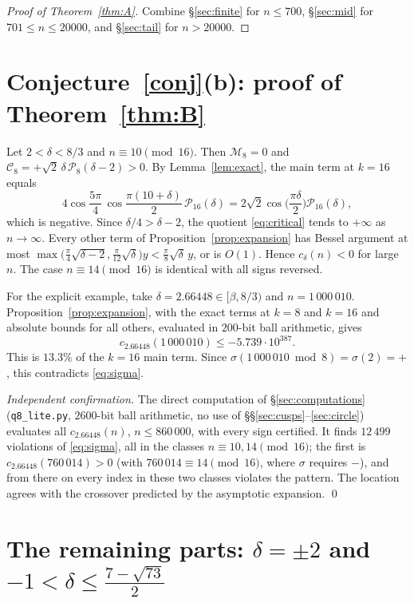 \documentclass[11pt]{amsart}
\theoremstyle{remark}
\theoremstyle{definition}
\newcommand{\cP}{\mathcal P}
\begin{document}
\begin{proof}[Proof of Theorem~\ref{thm:A}]
Combine \S\ref{sec:finite} for $n\le700$, \S\ref{sec:mid} for $701\le n\le20000$, and \S\ref{sec:tail} for $n>20000$.
\end{proof}

\section{Conjecture~\ref{conj}(b): proof of Theorem~\ref{thm:B}}\label{sec:B}

Let $2<\delta<8/3$ and $n\equiv10\pmod{16}$. Then $\mathcal M_8=0$ and $\mathcal C_8=+\sqrt2\,\delta\,\cP_8(\delta-2)>0$. By Lemma~\ref{lem:exact}, the main term at $k=16$ equals
\[
4\cos\frac{5\pi}4\,\cos\frac{\pi(10+\delta)}2\,\cP_{16}(\delta)=2\sqrt2\cos\Big(\frac{\pi\delta}2\Big)\cP_{16}(\delta),
\]
which is negative. Since $\delta/4>\delta-2$, the quotient \eqref{eq:critical} tends to $+\infty$ as $n\to\infty$. Every other term of Proposition~\ref{prop:expansion} has Bessel argument at most $\max\big(\frac\pi4\sqrt{\delta-2},\frac\pi{12}\sqrt\delta\big)y<\frac\pi8\sqrt\delta\,y$, or is $O(1)$. Hence $c_\delta(n)<0$ for large $n$. The case $n\equiv14\pmod{16}$ is identical with all signs reversed.

For the explicit example, take $\delta=2.66448\in[\beta,8/3)$ and $n=1\,000\,010$. Proposition~\ref{prop:expansion}, with the exact terms at $k=8$ and $k=16$ and absolute bounds for all others, evaluated in $200$-bit ball arithmetic, gives
\[
c_{2.66448}(1\,000\,010)\le-5.739\cdot10^{387}.
\]
This is $13.3\%$ of the $k=16$ main term. Since $\sigma(1\,000\,010\bmod8)=\sigma(2)=+$, this contradicts \eqref{eq:sigma}.

\emph{Independent confirmation.} The direct computation of \S\ref{sec:computations} (\texttt{q8\_lite.py}, $2600$-bit ball arithmetic, no use of \S\S\ref{sec:cusps}--\ref{sec:circle}) evaluates all $c_{2.66448}(n)$, $n\le860\,000$, with every sign certified. It finds $12\,499$ violations of \eqref{eq:sigma}, all in the classes $n\equiv10,14\pmod{16}$; the first is $c_{2.66448}(760\,014)>0$ (with $760\,014\equiv14\pmod{16}$, where $\sigma$ requires $-$), and from there on every index in these two classes violates the pattern. The location agrees with the crossover predicted by the asymptotic expansion.
\qed

\section{The remaining parts: \texorpdfstring{$\delta=\pm2$}{delta = +-2} and \texorpdfstring{$-1<\delta\le\frac{7-\sqrt{73}}2$}{-1 < delta <= (7-sqrt73)/2}}\label{sec:rest}
\end{document}
